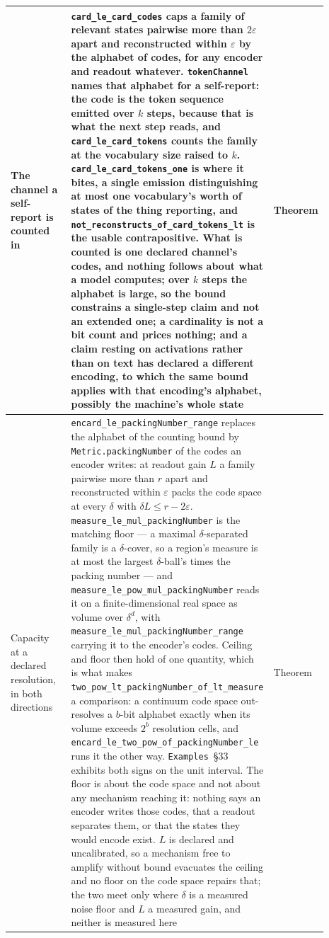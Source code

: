 \documentclass{article}
\begin{document}
\begin{longtable}{|>{\raggedright\arraybackslash}p{0.26\linewidth}|>{\raggedright\arraybackslash}p{0.46\linewidth}|>{\raggedright\arraybackslash}p{0.17\linewidth}|}
The channel a self-report is counted in & \nolinkurl{card_le_card_codes} caps a family of relevant states pairwise more than $2\varepsilon$ apart and reconstructed within $\varepsilon$ by the alphabet of codes, for any encoder and readout whatever. \texttt{tokenChannel} names that alphabet for a self-report: the code is the token sequence emitted over $k$ steps, because that is what the next step reads, and \nolinkurl{card_le_card_tokens} counts the family at the vocabulary size raised to $k$. \nolinkurl{card_le_card_tokens_one} is where it bites, a single emission distinguishing at most one vocabulary's worth of states of the thing reporting, and \nolinkurl{not_reconstructs_of_card_tokens_lt} is the usable contrapositive. What is counted is one declared channel's codes, and nothing follows about what a model computes; over $k$ steps the alphabet is large, so the bound constrains a single-step claim and not an extended one; a cardinality is not a bit count and prices nothing; and a claim resting on activations rather than on text has declared a different encoding, to which the same bound applies with that encoding's alphabet, possibly the machine's whole state & Theorem \\ \hline
Capacity at a declared resolution, in both directions & \nolinkurl{encard_le_packingNumber_range} replaces the alphabet of the counting bound by \texttt{Metric.packingNumber} of the codes an encoder writes: at readout gain $L$ a family pairwise more than $r$ apart and reconstructed within $\varepsilon$ packs the code space at every $\delta$ with $\delta L\leq r-2\varepsilon$. \nolinkurl{measure_le_mul_packingNumber} is the matching floor --- a maximal $\delta$-separated family is a $\delta$-cover, so a region's measure is at most the largest $\delta$-ball's times the packing number --- and \nolinkurl{measure_le_pow_mul_packingNumber} reads it on a finite-dimensional real space as volume over $\delta^{d}$, with \nolinkurl{measure_le_mul_packingNumber_range} carrying it to the encoder's codes. Ceiling and floor then hold of one quantity, which is what makes \nolinkurl{two_pow_lt_packingNumber_of_lt_measure} a comparison: a continuum code space out-resolves a $b$-bit alphabet exactly when its volume exceeds $2^{b}$ resolution cells, and \nolinkurl{encard_le_two_pow_of_packingNumber_le} runs it the other way. \texttt{Examples}~\S33 exhibits both signs on the unit interval. The floor is about the code space and not about any mechanism reaching it: nothing says an encoder writes those codes, that a readout separates them, or that the states they would encode exist. $L$ is declared and uncalibrated, so a mechanism free to amplify without bound evacuates the ceiling and no floor on the code space repairs that; the two meet only where $\delta$ is a measured noise floor and $L$ a measured gain, and neither is measured here & Theorem \\ \hline

\end{longtable}
\end{document}
